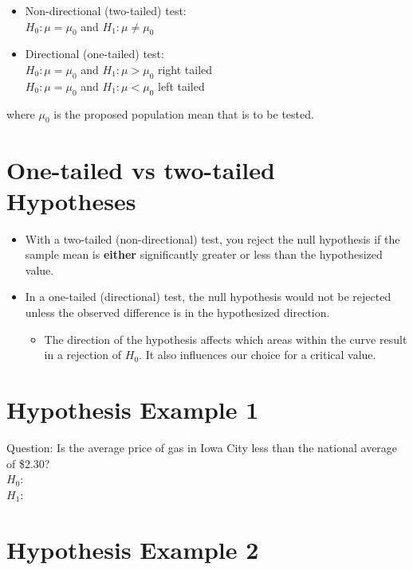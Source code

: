 \documentclass[12pt]{article}
\begin{document}
\begin{itemize}
\itemsep1pt\parskip0pt
\item
  Non-directional (two-tailed) test:\\\(H_{0}: \mu = \mu_{0}\) and
  \(H_{1}: \mu \neq \mu_{0}\)
\item
  Directional (one-tailed) test:\\\(H_{0}: \mu = \mu_{0}\) and
  \(H_{1}: \mu > \mu_{0}\) right tailed\\\(H_{0}: \mu = \mu_{0}\) and
  \(H_{1}: \mu < \mu_{0}\) left tailed
\end{itemize}

where \(\mu_{0}\) is the proposed population mean that is to be tested.

\section{One-tailed vs two-tailed
Hypotheses}\label{one-tailed-vs-two-tailed-hypotheses}

\begin{itemize}
\itemsep1pt\parskip0pt
\item
  With a two-tailed (non-directional) test, you reject the null
  hypothesis if the sample mean is \textbf{either} significantly greater
  or less than the hypothesized value.
\item
  In a one-tailed (directional) test, the null hypothesis would not be
  rejected unless the observed difference is in the hypothesized
  direction.

  \begin{itemize}
  \itemsep1pt\parskip0pt
  \item
    The direction of the hypothesis affects which areas within the curve
    result in a rejection of \(H_{0}\). It also influences our choice
    for a critical value.
  \end{itemize}
\end{itemize}

\section{Hypothesis Example 1}\label{hypothesis-example-1}

Question: Is the average price of gas in Iowa City less than the
national average of \$2.30?\\ \(H_{0}:\)\\ \(H_{1}:\)

\section{Hypothesis Example 2}\label{hypothesis-example-2}
\end{document}
